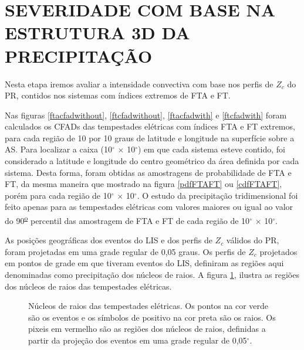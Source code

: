 \section{SEVERIDADE COM BASE NA ESTRUTURA 3D DA PRECIPITAÇÃO}

Nesta etapa iremos avaliar a intensidade convectiva com base nos perfis de $Z_c$ do PR, contidos nos sistemas com índices extremos de FTA e FT. 

Nas figuras \ref{ftacfadwithout}, \ref{ftcfadwithout},  \ref{ftacfadwith} e \ref{ftcfadwith} foram calculados os CFADs das tempestades elétricas com índices FTA e FT extremos, para cada região de 10 por 10 graus de latitude e longitude na superfície sobre a AS. Para localizar a caixa (10$^{\circ}$ $\times$ 10$^{\circ}$) em que cada sistema esteve contido, foi considerado a latitude e longitude do centro geométrico da área definida por cada sistema. Desta forma, foram obtidas as amostragens de probabilidade de FTA e FT, da mesma maneira que mostrado na figura \ref{pdfFTAFT} ou \ref{cdfFTAFT}, porém para cada região de 10$^{\circ}$ $\times$ 10$^{\circ}$. O estudo da precipitação tridimensional foi feito apenas para as tempestades elétricas com valores maiores ou igual ao valor do    90\textsuperscript{\underline{o}} percentil das amostragem de FTA e FT de cada região de 10$^{\circ}$ $\times$ 10$^{\circ}$.

As posições geográficas dos eventos do LIS e dos perfis de $Z_c$ válidos do PR, foram projetadas em uma grade regular de 0,05 graus. Os perfis de $Z_c$ projetados em pontos de grade em que tiveram eventos do LIS, definiram as regiões aqui denominadas como precipitação dos núcleos de raios. A figura \ref{nucleosRaios}, ilustra as regiões dos núcleos de raios das tempestades elétricas.


\begin{figure}[!htb]
  \caption{Núcleos de raios das tempestades elétricas. Os pontos na cor  verde são os eventos e os símbolos de positivo na cor preta são os raios. Os pixeis em vermelho são as regiões dos núcleos de raios, definidas a partir da projeção dos eventos em uma grade regular de 0,05$^{\circ}$.} %
\label{nucleosRaios}
\end{figure}


